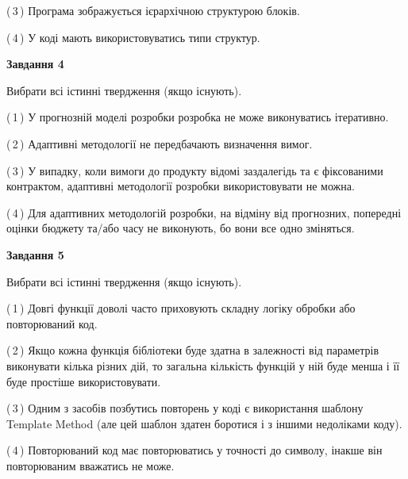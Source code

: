 \documentclass[10pt, ukrainian]{article}
\begin{document}
{\begin {large}
(\,3\,) Програма зображується ієрархічною структурою блоків.%



(\,4\,) У коді мають використовуватись типи структур. %


{\begin {center}\textbf{Завдання 4}\end {center}}\par
Вибрати всі істинні твердження (якщо існують).\par
\vspace{2mm}



(\,1\,) У прогнозній моделі розробки розробка не може виконуватись ітеративно. %



(\,2\,) Адаптивні методології не передбачають визначення вимог. %



(\,3\,) У випадку, коли вимоги до продукту відомі заздалегідь та є фіксованими контрактом, адаптивні методології розробки використовувати не можна. %



(\,4\,) Для адаптивних методологій розробки, на відміну від прогнозних, попередні оцінки бюджету та/або часу не виконують, бо вони все одно зміняться. %


{\begin {center}\textbf{Завдання 5}\end {center}}\par
Вибрати всі істинні твердження (якщо існують).\par
\vspace{2mm}



(\,1\,) Довгі функції доволі часто приховують складну логіку обробки або повторюваний код. %



(\,2\,) Якщо кожна функція бібліотеки буде здатна в залежності від параметрів виконувати кілька різних дій, то загальна кількість функцій у ній буде менша і її буде простіше використовувати. %



(\,3\,) Одним з засобів позбутись повторень у коді є використання шаблону Template Method (але цей шаблон здатен боротися і з іншими недоліками коду). %



(\,4\,) Повторюваний код має повторюватись у точності до символу, інакше він повторюваним вважатись не може. %


\end{large}}
\end{document}
